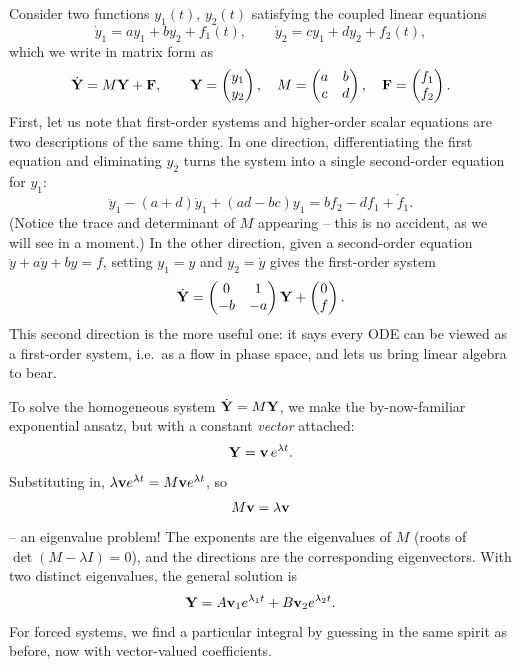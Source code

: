 \documentclass[a4paper]{scrartcl}
\begin{document}
Consider two functions $y_1(t)$, $y_2(t)$ satisfying the coupled linear equations
$$
\dot y_1 = a y_1 + b y_2 + f_1(t), \qquad \dot y_2 = c y_1 + d y_2 + f_2(t),
$$
which we write in matrix form as
$$
\dot{\mathbf{Y}} = M \mathbf{Y} + \mathbf{F}, \qquad
\mathbf{Y} = \begin{pmatrix} y_1 \\ y_2 \end{pmatrix}, \quad
M = \begin{pmatrix} a & b \\ c & d\end{pmatrix}, \quad
\mathbf{F} = \begin{pmatrix} f_1 \\ f_2 \end{pmatrix}.
$$
First, let us note that first-order systems and higher-order scalar equations are two descriptions of the same thing. In one direction, differentiating the first equation and eliminating $y_2$ turns the system into a single second-order equation for $y_1$:
$$
\ddot y_1 - (a + d) \dot y_1 + (ad - bc) y_1 = b f_2 - d f_1 + \dot f_1.
$$
(Notice the trace and determinant of $M$ appearing -- this is no accident, as we will see in a moment.) In the other direction, given a second-order equation $\ddot y + a \dot y + by = f$, setting $y_1 = y$ and $y_2 = \dot y$ gives the first-order system
$$
\dot{\mathbf{Y}} = \begin{pmatrix} 0 & 1 \\ -b & -a \end{pmatrix} \mathbf{Y} + \begin{pmatrix} 0 \\ f\end{pmatrix}.
$$
This second direction is the more useful one: it says every ODE can be viewed as a first-order system, i.e.\ as a flow in phase space, and lets us bring linear algebra to bear.

To solve the homogeneous system $\dot{\mathbf{Y}} = M \mathbf{Y}$, we make the by-now-familiar exponential ansatz, but with a constant \emph{vector} attached:
$$
\mathbf{Y} = \mathbf{v} \, e^{\lambda t}.
$$
Substituting in, $\lambda \mathbf{v} e^{\lambda t} = M \mathbf{v} e^{\lambda t}$, so
$$
M \mathbf{v} = \lambda \mathbf{v}
$$
-- an eigenvalue problem! The exponents are the eigenvalues of $M$ (roots of $\det(M - \lambda I) = 0$), and the directions are the corresponding eigenvectors. With two distinct eigenvalues, the general solution is
$$
\mathbf{Y} = A \mathbf{v}_1 e^{\lambda_1 t} + B \mathbf{v}_2 e^{\lambda_2 t}.
$$
For forced systems, we find a particular integral by guessing in the same spirit as before, now with vector-valued coefficients.
\end{document}
